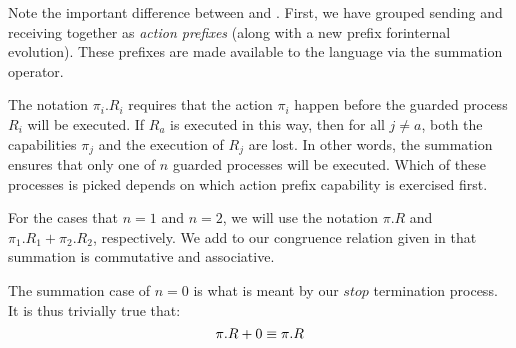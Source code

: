 
Note the important difference between  and .  First, we have grouped sending and receiving together as \emph{action prefixes} (along with a new prefix forinternal evolution). These prefixes are made available to the language via the summation operator. 

The notation $\pi_i.R_i$ requires that the action $\pi_i$ happen before the guarded process $R_i$ will be executed.  If $R_a$ is executed in this way, then for all $j \neq a$, both the capabilities $\pi_j$ and the execution of $R_j$ are lost.  In other words, the summation ensures that only one of $n$ guarded processes will be executed. Which of these processes is picked depends on which action prefix capability is exercised first. 

For the cases that $n=1$ and $n=2$, we will use the notation $\pi.R$ and $\pi_1.R_1 + \pi_2.R_2$, respectively.  We add to our congruence relation given in  that summation is commutative and associative.

The summation case of $n=0$ is what is meant by our $stop$ termination process.  It is thus trivially true that:
\[
	\pi.R + 0 \equiv \pi.R
\]

